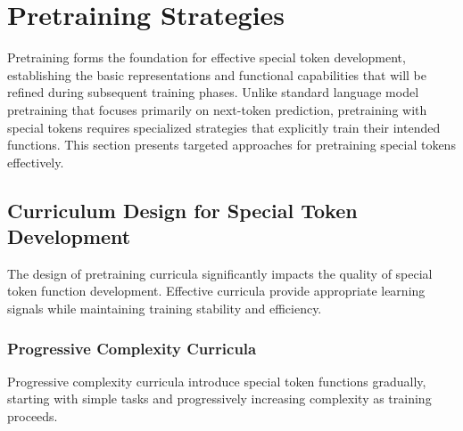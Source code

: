
\section{Pretraining Strategies}

Pretraining forms the foundation for effective special token development, establishing the basic representations and functional capabilities that will be refined during subsequent training phases. Unlike standard language model pretraining that focuses primarily on next-token prediction, pretraining with special tokens requires specialized strategies that explicitly train their intended functions. This section presents targeted approaches for pretraining special tokens effectively.
\begin{comment}
Feedback: Before diving into the specifics, it's helpful to frame the core challenge. For example: "The main challenge in pretraining special tokens is that they are often 'meta-level' instructions that are not naturally present in raw text. A standard pretraining objective like next-token prediction doesn't explicitly teach a [CLS] token how to summarize, or a [SEP] token how to separate concepts. Therefore, specialized pretraining strategies are needed to create learning signals that directly encourage these desired functions."
\end{comment}

\subsection{Curriculum Design for Special Token Development}

The design of pretraining curricula significantly impacts the quality of special token function development. Effective curricula provide appropriate learning signals while maintaining training stability and efficiency.

\subsubsection{Progressive Complexity Curricula}

Progressive complexity curricula introduce special token functions gradually, starting with simple tasks and progressively increasing complexity as training proceeds.
\begin{comment}
Feedback: A concrete example would make this concept much clearer. For instance: "A progressive curriculum for a model with [CLS] and [SEP] tokens might look like this:
1.  **Phase 1 (Language Modeling)**: Train the model on a standard masked language modeling (MLM) objective *without* the Next Sentence Prediction (NSP) task. This allows the content embeddings to stabilize and learn basic language.
2.  **Phase 2 (Introduce NSP)**: After the MLM loss has started to converge, introduce the NSP task, which specifically trains the [CLS] and [SEP] tokens to understand relationships between sentences.
This two-phase approach is often more stable than trying to learn everything simultaneously from scratch."
\end{comment}

